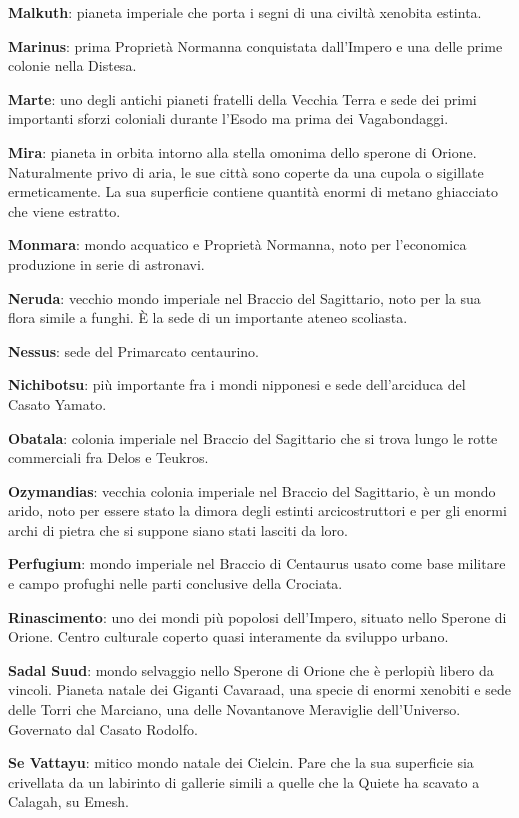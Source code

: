 \textbf{Malkuth}: pianeta imperiale che porta i segni di una civiltà
xenobita estinta.

\textbf{Marinus}: prima Proprietà Normanna conquistata dall'Impero e una
delle prime colonie nella Distesa.

\textbf{Marte}: uno degli antichi pianeti fratelli della Vecchia Terra e
sede dei primi importanti sforzi coloniali durante l'Esodo ma prima dei
Vagabondaggi.

\textbf{Mira}: pianeta in orbita intorno alla stella omonima dello
sperone di Orione. Naturalmente privo di aria, le sue città sono coperte
da una cupola o sigillate ermeticamente. La sua superficie contiene
quantità enormi di metano ghiacciato che viene estratto.

\textbf{Monmara}: mondo acquatico e Proprietà Normanna, noto per
l'economica produzione in serie di astronavi.

\textbf{Neruda}: vecchio mondo imperiale nel Braccio del Sagittario,
noto per la sua flora simile a funghi. È la sede di un importante ateneo
scoliasta.

\textbf{Nessus}: sede del Primarcato centaurino.

\textbf{Nichibotsu}: più importante fra i mondi nipponesi e sede
dell'arciduca del Casato Yamato.

\textbf{Obatala}: colonia imperiale nel Braccio del Sagittario che si
trova lungo le rotte commerciali fra Delos e Teukros.

\textbf{Ozymandias}: vecchia colonia imperiale nel Braccio del
Sagittario, è un mondo arido, noto per essere stato la dimora degli
estinti arcicostruttori e per gli enormi archi di pietra che si suppone
siano stati lasciti da loro.

\textbf{Perfugium}: mondo imperiale nel Braccio di Centaurus usato come
base militare e campo profughi nelle parti conclusive della Crociata.

\textbf{Rinascimento}: uno dei mondi più popolosi dell'Impero, situato
nello Sperone di Orione. Centro culturale coperto quasi interamente da
sviluppo urbano.

\textbf{Sadal Suud}: mondo selvaggio nello Sperone di Orione che è
perlopiù libero da vincoli. Pianeta natale dei Giganti Cavaraad, una
specie di enormi xenobiti e sede delle Torri che Marciano, una delle
Novantanove Meraviglie dell'Universo. Governato dal Casato Rodolfo.

\textbf{Se Vattayu}: mitico mondo natale dei Cielcin. Pare che la sua
superficie sia crivellata da un labirinto di gallerie simili a quelle
che la Quiete ha scavato a Calagah, su Emesh.

